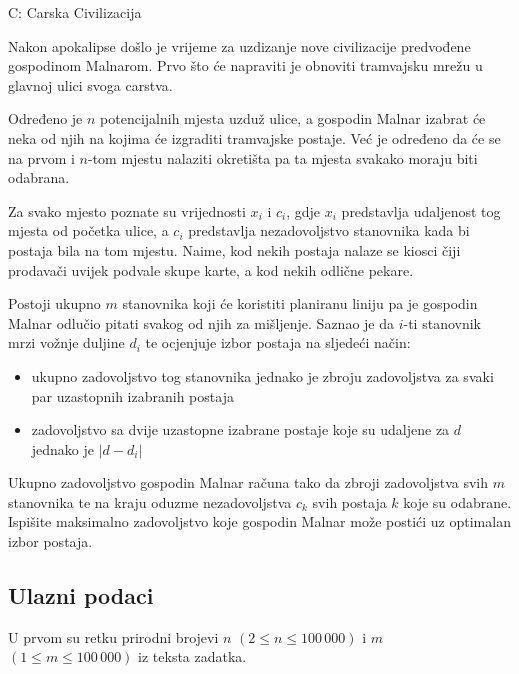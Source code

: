 \begin{statement}[
  timelimit=1.5 s,
  memorylimit=512 MiB,
]{C: Carska Civilizacija}

Nakon apokalipse došlo je vrijeme za uzdizanje nove civilizacije predvođene
gospodinom Malnarom. Prvo što će napraviti je obnoviti tramvajsku mrežu u
glavnoj ulici svoga carstva.

Određeno je $n$ potencijalnih mjesta uzduž ulice, a gospodin Malnar izabrat će
neka od njih na kojima će izgraditi tramvajske postaje. Već je određeno da će
se na prvom i $n$-tom mjestu nalaziti okretišta pa ta mjesta svakako moraju
biti odabrana.

Za svako mjesto poznate su vrijednosti $x_i$ i $c_i$, gdje $x_i$ predstavlja
udaljenost tog mjesta od početka ulice, a $c_i$ predstavlja nezadovoljstvo
stanovnika kada bi postaja bila na tom mjestu. Naime, kod nekih postaja
nalaze se kiosci čiji prodavači uvijek podvale skupe karte, a kod nekih
odlične pekare.

Postoji ukupno $m$ stanovnika koji će koristiti planiranu liniju pa je gospodin
Malnar odlučio pitati svakog od njih za mišljenje. Saznao je da $i$-ti
stanovnik mrzi vožnje duljine $d_i$ te ocjenjuje izbor postaja na sljedeći
način:

\vspace{-2.5mm}
\begin{itemize}
    \item ukupno zadovoljstvo tog stanovnika jednako je zbroju zadovoljstva za
          svaki par uzastopnih izabranih postaja
    \item zadovoljstvo sa dvije uzastopne izabrane postaje koje su udaljene za
          $d$ jednako je $|d - d_i|$
\end{itemize}
\vspace{-2.5mm}

Ukupno zadovoljstvo gospodin Malnar računa tako da zbroji zadovoljstva svih $m$
stanovnika te na kraju oduzme nezadovoljstva $c_k$ svih postaja $k$ koje su
odabrane. Ispišite maksimalno zadovoljstvo koje gospodin Malnar može postići
uz optimalan izbor postaja.

\subsection*{Ulazni podaci}
 U prvom su retku prirodni brojevi $n$ $(2 \le n \le 100\,000)$ i $m$
$(1 \le m \le 100\,000)$ iz teksta zadatka.


\end{statement}
